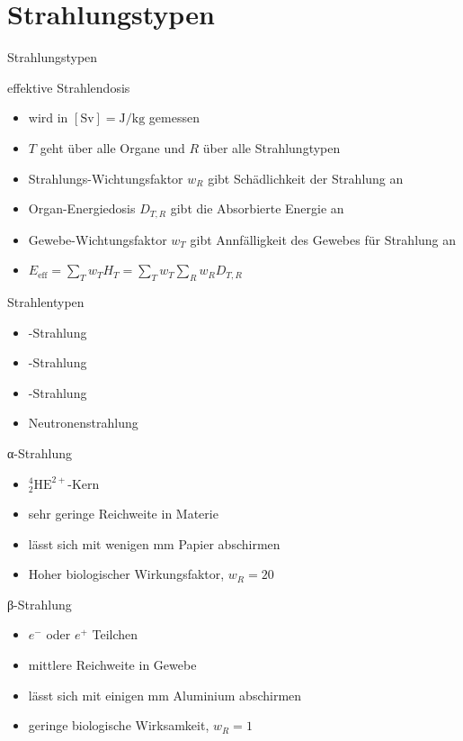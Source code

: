 \section{Strahlungstypen}
\begin{frame}
	\begin{block}{Strahlungstypen}
	\end{block}
\end{frame}
\begin{frame}{effektive Strahlendosis}
\begin{itemize}
	\item wird in $[\si{\sievert}]=\si{\joule \per \kilo \gram}$ gemessen
	\item $T$ geht über alle Organe und $R$ über alle Strahlungtypen
	\item Strahlungs-Wichtungsfaktor $w_R$ gibt Schädlichkeit der Strahlung an
	\item Organ-Energiedosis $D_{T,R}$ gibt die Absorbierte Energie an
	\item Gewebe-Wichtungsfaktor $w_T$ gibt Annfälligkeit des Gewebes für Strahlung an
	\item $E_\mathrm{eff}=\sum_T w_TH_T =\sum_T w_T \sum_R w_RD_{T,R}$
\end{itemize}
\end{frame}
\begin{frame}{Strahlentypen}
	\begin{itemize}
		\item \alpha-Strahlung
		\item \beta-Strahlung
		\item \gamma-Strahlung
		\item Neutronenstrahlung
	\end{itemize}
\end{frame}
\begin{frame}{α-Strahlung}
	\begin{itemize}
		\item ${}^4_2\text{HE}^{2+}$-Kern
		\item sehr geringe Reichweite in Materie
		\item lässt sich mit wenigen \si{\milli \meter} Papier abschirmen
		\item Hoher biologischer Wirkungsfaktor, $w_R=20$
	\end{itemize}
\end{frame}
\begin{frame}{β-Strahlung}
\begin{itemize}
	\item $e^-$ oder $e^+$ Teilchen
	\item mittlere Reichweite in Gewebe
	\item lässt sich mit einigen \si{\milli \meter} Aluminium abschirmen
	\item geringe biologische Wirksamkeit, $w_R=1$
\end{itemize}
\end{frame}
